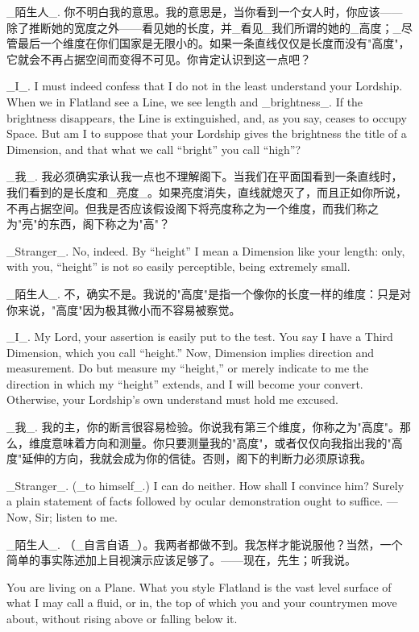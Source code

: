 \documentclass[12pt,UTF8]{ctexbook}
\begin{document}
\_陌生人\_. 你不明白我的意思。我的意思是，当你看到一个女人时，你应该——除了推断她的宽度之外——看见她的长度，并\_看见\_我们所谓的她的\_高度；\_尽管最后一个维度在你们国家是无限小的。如果一条直线仅仅是长度而没有"高度"，它就会不再占据空间而变得不可见。你肯定认识到这一点吧？

\_I\_. I must indeed confess that I do not in the least understand your Lordship. When we in Flatland see a Line, we see length and \_brightness\_. If the brightness disappears, the Line is extinguished, and, as you say, ceases to occupy Space. But am I to suppose that your Lordship gives the brightness the title of a Dimension, and that what we call ``bright'' you call ``high''?

\_我\_. 我必须确实承认我一点也不理解阁下。当我们在平面国看到一条直线时，我们看到的是长度和\_亮度\_。如果亮度消失，直线就熄灭了，而且正如你所说，不再占据空间。但我是否应该假设阁下将亮度称之为一个维度，而我们称之为"亮"的东西，阁下称之为"高"？

\_Stranger\_. No, indeed. By ``height'' I mean a Dimension like your length: only, with you, ``height'' is not so easily perceptible, being extremely small.

\_陌生人\_. 不，确实不是。我说的"高度"是指一个像你的长度一样的维度：只是对你来说，"高度"因为极其微小而不容易被察觉。

\_I\_. My Lord, your assertion is easily put to the test. You say I have a Third Dimension, which you call ``height.'' Now, Dimension implies direction and measurement. Do but measure my ``height,'' or merely indicate to me the direction in which my ``height'' extends, and I will become your convert. Otherwise, your Lordship's own understand must hold me excused.

\_我\_. 我的主，你的断言很容易检验。你说我有第三个维度，你称之为"高度"。那么，维度意味着方向和测量。你只要测量我的"高度"，或者仅仅向我指出我的"高度"延伸的方向，我就会成为你的信徒。否则，阁下的判断力必须原谅我。

\_Stranger\_. (\_to himself\_.) I can do neither. How shall I convince him? Surely a plain statement of facts followed by ocular demonstration ought to suffice. ---Now, Sir; listen to me.

\_陌生人\_. （\_自言自语\_）。我两者都做不到。我怎样才能说服他？当然，一个简单的事实陈述加上目视演示应该足够了。——现在，先生；听我说。

You are living on a Plane. What you style Flatland is the vast level surface of what I may call a fluid, or in, the top of which you and your countrymen move about, without rising above or falling below it.
\end{document}
